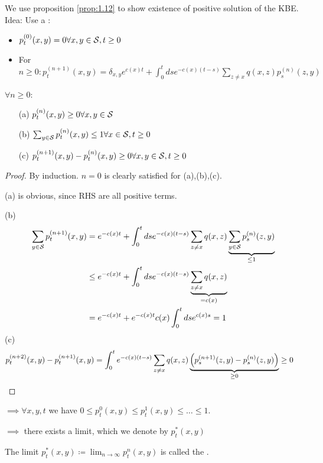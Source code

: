 We use proposition \ref{prop:1.12} to show existence of positive solution of the KBE. Idea: Use a :
\begin{itemize}
    \item \(p_t^{(0)}(x,y)=0\forall x,y\in\mathcal{S},t\geq 0\)
    \item For \(n\geq 0: p_t^{(n+1)}(x,y)=\delta_{x,y}e^{c(x)t}+\int_{0}^t ds e^{-c(x)(t-s)}\sum_{z\neq x}q(x,z)p_s^{(n)}(z,y)\)
\end{itemize}

\begin{lemma}\label{lem:1.13}
    \(\forall n\geq 0\): \begin{enumerate}
        \item[(a)] \(p_t^{(n)}(x,y)\geq 0\forall x,y\in\mathcal{S}\)
        \item[(b)] \(\sum_{y\in\mathcal{S}}p_t^{(n)}(x,y)\leq 1\forall x\in\mathcal{S},t\geq 0\)
        \item[(c)] \(p_t^{(n+1)}(x,y)-p_t^{(n)}(x,y)\geq 0\forall x,y\in\mathcal{S},t\geq 0\)   
    \end{enumerate}
\end{lemma}


\begin{proof}
    By induction. \(n=0\) is clearly satisfied for (a),(b),(c).

    (a) is obvious, since RHS are all positive terms.

    (b) \begin{align*}
        \sum_{y\in\mathcal{S}} p_t^{(n+1)}(x,y)&=e^{-c(x)t}+\int_{0}^t ds e^{-c(x)(t-s)}\sum_{z\neq x}q(x,z)\underbrace{\sum_{y\in\mathcal{S}}p_s^{(n)}(z,y)}_{\leq 1}\\
        &\leq e^{-c(x)t}+\int_{0}^t ds e^{-c(x)(t-s)} \underbrace{\sum_{z\neq x} q(x,z)}_{=c(x)}\\
        &=e^{-c(x)t}+ e^{-c(x)t}c(x)\int_0^t ds e^{c(x)s}=1
    \end{align*}
    (c) 
    \begin{align*}
        p_t^{(n+2)}(x,y)-p_t^{(n+1)}(x,y)&=\int_0^t e^{-c(x)(t-s)}\sum_{z\neq x} q(x,z)\underbrace{\left(p_s^{(n+1)}(z,y)-p_s^{(n)}(z,y)\right)}_{\geq 0}\geq 0\qedhere
    \end{align*}
\end{proof}

\(\implies \forall x,y,t\) we have \(0\leq p_t^{0}(x,y)\leq p_t^{1}(x,y)\leq \dots\leq 1\).

\(\implies\) there exists a limit, which we denote by \(p_t^*(x,y)\)
\begin{definition}\label{def:1.14}
    The limit \(p_t^{*}(x,y)\coloneqq \lim_{n\to\infty} p_t^{n}(x,y)\)
    is called the .
\end{definition}

